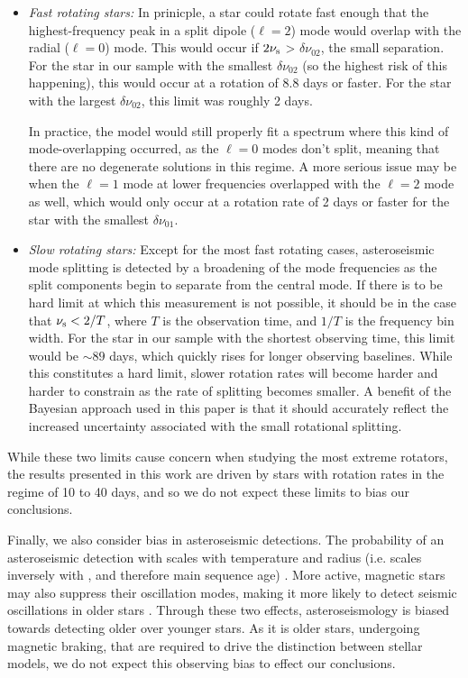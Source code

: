 \begin{itemize}
	\item \textit{Fast rotating stars:} In prinicple, a star could rotate fast enough that the highest-frequency peak in a split dipole ($\ell = 2$) mode would overlap with the radial ($\ell = 0$) mode. This would occur if $2\nu_{\rm s}$ > $\delta\nu_{02}$, the small separation. For the star in our sample with the smallest $\delta\nu_{02}$ (so the highest risk of this happening), this would occur at a rotation of 8.8 days or faster. For the star with the largest $\delta\nu_{02}$, this limit was roughly 2 days.
	
	In practice, the model would still properly fit a spectrum where this kind of mode-overlapping occurred, as the $\ell = 0$ modes don't split, meaning that there are no degenerate solutions in this regime. A more serious issue may be when the $\ell = 1$ mode at lower frequencies overlapped with the $\ell = 2$ mode as well, which would only occur at a rotation rate of 2 days or faster for the star with the smallest $\delta\nu_{01}$.
	
	\item \textit{Slow rotating stars:} Except for the most fast rotating cases, asteroseismic mode splitting is detected by a broadening of the mode frequencies as the split components begin to separate from the central mode. If there is to be hard limit at which this measurement is not possible, it should be in the case that $\nu_{\rm s} < 2/T$, where $T$ is the observation time, and $1/T$ is the frequency bin width. For the star in our sample with the shortest observing time, this limit would be $\sim 89$ days, which quickly rises for longer observing baselines. While this constitutes a hard limit, slower rotation rates will become harder and harder to constrain as the rate of splitting becomes smaller. A benefit of the Bayesian approach used in this paper is that it should accurately reflect the increased uncertainty associated with the small rotational splitting.
\end{itemize}

While these two limits cause concern when studying the most extreme rotators, the results presented in this work are driven by stars with rotation rates in the regime of 10 to 40 days, and so we do not expect these limits to bias our conclusions.

Finally, we also consider bias in asteroseismic detections. The probability of an asteroseismic detection with \kepler scales with temperature and radius (i.e. scales inversely with \logg, and therefore main sequence age) \cite{chaplin+2011, schofield+2019}. More active, magnetic stars may also suppress their oscillation modes, making it more likely to detect seismic oscillations in older stars \cite{mathur+2019}. Through these two effects, asteroseismology is biased towards detecting older over younger stars. As it is older stars, undergoing magnetic braking, that are required to drive the distinction between stellar models, we do not expect this observing bias to effect our conclusions.


